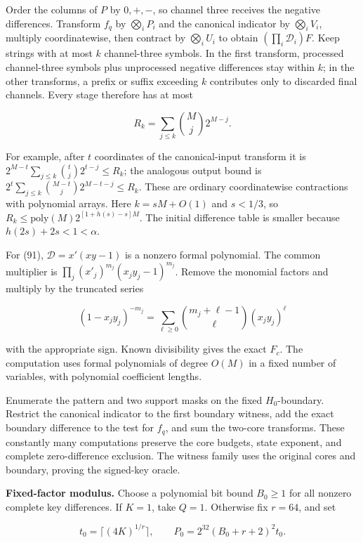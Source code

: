 Order the columns of \(P\) by \(0,+,-\), so channel three receives the negative differences. Transform \(f_q\) by \(\bigotimes_iP_i\) and the canonical indicator by \(\bigotimes_iV_i\), multiply coordinatewise, then contract by \(\bigotimes_iU_i\) to obtain \((\prod_i\mathcal D_i)F\). Keep strings with at most \(k\) channel-three symbols. In the first transform, processed channel-three symbols plus unprocessed negative differences stay within \(k\); in the other transforms, a prefix or suffix exceeding \(k\) contributes only to discarded final channels. Every stage therefore has at most

\[
R_k=\sum_{j\le k}\binom Mj2^{M-j}.
\tag{93}
\]

For example, after \(t\) coordinates of the canonical-input transform it is \(2^{M-t}\sum_{j\le k}\binom tj2^{t-j}\le R_k\); the analogous output bound is \(2^t\sum_{j\le k}\binom{M-t}j2^{M-t-j}\le R_k\). These are ordinary coordinatewise contractions with polynomial arrays. Here \(k=sM+O(1)\) and \(s<1/3\), so \(R_k\le\mathrm{poly}(M)2^{[1+h(s)-s]M}\). The initial difference table is smaller because \(h(2s)+2s<1<\alpha\).

For (91), \(\mathcal D=x'(xy-1)\) is a nonzero formal polynomial. The common multiplier is \(\prod_j(x'_j)^{m_j}(x_jy_j-1)^{m_j}\). Remove the monomial factors and multiply by the truncated series

\[
(1-x_jy_j)^{-m_j}
=\sum_{\ell\ge0}\binom{m_j+\ell-1}{\ell}(x_jy_j)^\ell
\tag{94}
\]

with the appropriate sign. Known divisibility gives the exact \(F_c\). The computation uses formal polynomials of degree \(O(M)\) in a fixed number of variables, with polynomial coefficient lengths.

Enumerate the pattern and two support masks on the fixed \(H_0\)-boundary. Restrict the canonical indicator to the first boundary witness, add the exact boundary difference to the test for \(f_q\), and sum the two-core transforms. These constantly many computations preserve the core budgets, state exponent, and complete zero-difference exclusion. The witness family uses the original cores and boundary, proving the signed-key oracle.

\textbf{Fixed-factor modulus.} Choose a polynomial bit bound \(B_0\ge1\) for all nonzero complete key differences. If \(K=1\), take \(Q=1\). Otherwise fix \(r=64\), and set

\[
t_0=\lceil(4K)^{1/r}\rceil,\qquad
P_0=2^{32}(B_0+r+2)^2t_0.
\tag{95}
\]

